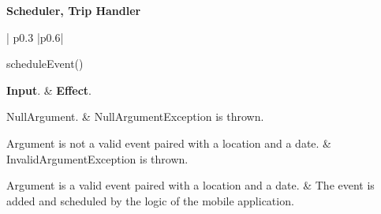 	\textbf{Scheduler, Trip Handler}\\
		\begin{tabular}{| p{} |p{}|}
			\hline
			\hline
			
			 {scheduleEvent() }\\
			\hline
			
			\textbf{Input}.		&		\textbf{Effect}.\\
			\hline
			\hline
			
			NullArgument.		&		NullArgumentException is thrown.\\
			\hline
			
			Argument is not a valid event paired with a location and a date.		&		InvalidArgumentException is thrown.\\
			\hline
		
			Argument is a valid event paired with a location and a date.		&		The event is added and scheduled by the logic of the mobile application.\\
			\hline
			\hline
		\end{tabular}

	\vskip1cm

